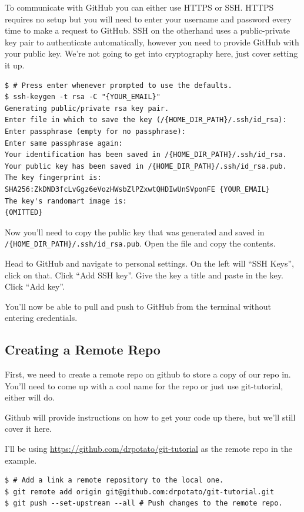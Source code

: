 \documentclass{tufte-handout}
\begin{document}
\noindent To communicate with GitHub you can either use HTTPS or SSH. HTTPS requires no setup but you will need to enter your username and password every time to make a request to GitHub. SSH on the otherhand uses a public-private key pair to authenticate automatically, however you need to provide GitHub with your public key. We're not going to get into cryptography here, just cover setting it up.

\begin{lstlisting}
$ # Press enter whenever prompted to use the defaults.
$ ssh-keygen -t rsa -C "{YOUR_EMAIL}"
Generating public/private rsa key pair.
Enter file in which to save the key (/{HOME_DIR_PATH}/.ssh/id_rsa):
Enter passphrase (empty for no passphrase):
Enter same passphrase again:
Your identification has been saved in /{HOME_DIR_PATH}/.ssh/id_rsa.
Your public key has been saved in /{HOME_DIR_PATH}/.ssh/id_rsa.pub.
The key fingerprint is:
SHA256:ZkDND3fcLvGgz6eVozHWsbZlPZxwtQHDIwUnSVponFE {YOUR_EMAIL}
The key's randomart image is:
{OMITTED}
\end{lstlisting}

\noindent Now you'll need to copy the public key that was generated and saved in \lstinline!/{HOME_DIR_PATH}/.ssh/id_rsa.pub!. Open the file and copy the contents.

\noindent Head to GitHub and navigate to personal settings. On the left will ``SSH Keys'', click on that. Click ``Add SSH key''. Give the key a title and paste in the key. Click ``Add key''.

\noindent You'll now be able to pull and push to GitHub from the terminal without entering credentials.

\subsection{Creating a Remote Repo}

\noindent First, we need to create a remote repo on github to store a copy of our repo in. You'll need to come up with a cool name for the repo or just use git-tutorial, either will do.

\noindent Github will provide instructions on how to get your code up there, but we'll still cover it here.

\noindent I'll be using \url{https://github.com/drpotato/git-tutorial} as the remote repo in the example.

\begin{lstlisting}
$ # Add a link a remote repository to the local one.
$ git remote add origin git@github.com:drpotato/git-tutorial.git
$ git push --set-upstream --all # Push changes to the remote repo.
\end{lstlisting}
\end{document}
